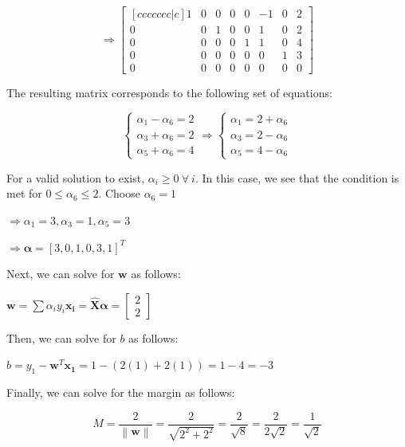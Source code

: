 \documentclass[fleqn]{article}
\newcommand{\norm}[1]{\left \lVert #1 \right \rVert}
\begin{document}
\begin{enumerate}
\begin{enumerate}
		\begin{equation*}
			\Rightarrow \begin{bmatrix}[ccccccc|c]
				1 & 0 & 0 & 0 & 0 & -1 & 0 & 2 \\
     			0 & 0 & 1 & 0 & 0 &  1 & 0 & 2 \\
               	0 & 0 & 0 & 0 & 1 &  1 & 0 & 4 \\
     			0 & 0 & 0 & 0 & 0 &  0 & 1 & 3 \\
     			0 & 0 & 0 & 0 & 0 &  0 & 0 & 0
			\end{bmatrix}
		\end{equation*}
		
		The resulting matrix corresponds to the following set of equations:
		
		\begin{equation*}
			\begin{cases}
				\alpha_1 - \alpha_6 = 2 \\
				\alpha_3 + \alpha_6 = 2 \\
				\alpha_5 + \alpha_6 = 4
			\end{cases} \Rightarrow \begin{cases}
				\alpha_1 = 2 + \alpha_6 \\
				\alpha_3 = 2 - \alpha_6 \\
				\alpha_5 = 4 - \alpha_6
			\end{cases}
		\end{equation*}
		
		For a valid solution to exist, $\alpha_i \geq 0\ \forall\ i$. In this case, we see that the condition is met for $0 \leq \alpha_6 \leq 2$. Choose $\alpha_6 = 1$
		
		$\Rightarrow \alpha_1 = 3, \alpha_3 = 1, \alpha_5 = 3$
		
		$\Rightarrow\boldsymbol{\alpha} = [3,0,1,0,3,1]^T$
		
		Next, we can solve for $\mathbf{w}$ as follows:
		
		$\mathbf{w} = \sum{\alpha_iy_i\mathbf{x_i}} = \mathbf{\hat{X}}\boldsymbol{\alpha} = \begin{bmatrix} 2 \\ 2 \end{bmatrix}$
		
		Then, we can solve for $b$ as follows:
	
		$b = y_1 - \mathbf{w}^T\mathbf{x_1} = 1 - (2(1) + 2(1)) = 1 - 4 = -3$
		
		Finally, we can solve for the margin as follows:
		
		\begin{equation*}
			M = \frac{2}{\norm{\mathbf{w}}} = \frac{2}{\sqrt{2^2 + 2^2}} = \frac{2}{\sqrt{8}} = \frac{2}{2\sqrt{2}} = \frac{1}{\sqrt{2}}
		\end{equation*}
		

\end{enumerate}
\end{enumerate}
\end{document}
